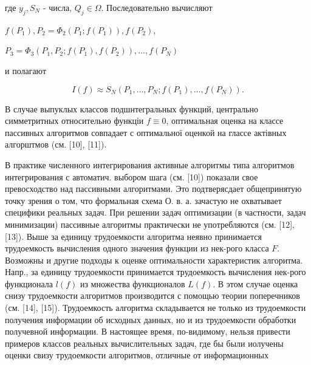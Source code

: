 \documentclass[10pt]{article}
\begin{document}
где $y_{j}, S_{N}$ - числа, $Q_{j} \in \Omega$. Последовательно вычисляют

$f\left(P_{1}\right), P_{2}=\Phi_{2}\left(P_{1} ; f\left(P_{1}\right)\right), f\left(P_{2}\right)$,

$P_{3}=\Phi_{3}\left(P_{1}, P_{2} ; f\left(P_{1}\right), f\left(P_{2}\right)\right), \ldots, f\left(P_{N}\right)$

и полагают

\[
I(f) \approx S_{N}\left(P_{1}, \ldots, P_{N} ; f\left(P_{1}\right), \ldots, f\left(P_{N}\right)\right) .
\]

В случае выпуклых классов подшнтегральных функций, центрально симметритных относительно функціи $f \equiv 0$, оптимальная оценка на классе пассивных алгоритмов совпадает с оптимальної оценкой на глассе актівных алгорштмов (см. [10], [11]).

В практике численного интегрирования активные алгоритмы типа алгоритмов интегрирования с автоматич. выбором шага (см. [10]) показали свое превосходство над пассивными алгоритмами. Это подтверясдает общепринятую точку зрения о том, что формальная схема О. в. а. зачастую не охватывает специфики реальных задач. При решении задач оптимизации (в частности, задач минимизации) пассивные алгоритмы практически не употребляются (см. [12], [13]). Выше за единицу трудоемкости алгоритма неявно принимается трудоемкость вычисления одного значения функции из нек-рого класса $F$. Возможны и другие подходы к оценке оптимальности характеристик алгоритма. Напр., за единицу трудоемкости принимается трудоемкость вычисления нек-рого функционала $l(f)$ из множества функционалов $L(f)$. В этом случае оценка снизу трудоемкости алгоритмов производится с помощью теории поперечников (см. [14], [15]). Трудоемкость алгоритма складывается не только из трудоемкости получения информации об исходных данных, но и из трудоемкости обработки получевной информации. В настоящее время, по-видимому, нельзя привести примеров классов реальных вычислительных задач, где бы были иолучены оценки свизу трудоемкости алгоритмов, отличные от информационных
\end{document}
